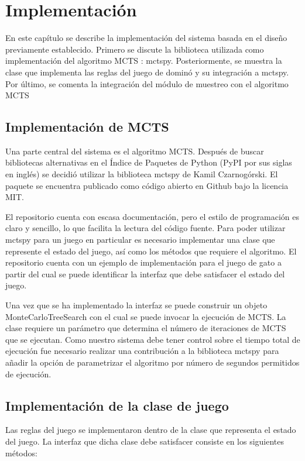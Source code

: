 \chapter{Implementación}

\noindent

En este capítulo se describe la implementación del sistema basada en el diseño
previamente establecido. Primero se discute la biblioteca utilizada como
implementación del algoritmo MCTS : mctspy. Posteriormente, se muestra la clase
que implementa las reglas del juego de dominó y su integración a mctspy. Por
último, se comenta la integración del módulo de muestreo con el algoritmo MCTS

\section{Implementación de MCTS}

Una parte central del sistema es el algoritmo MCTS. Después de buscar bibliotecas
alternativas en el Índice de Paquetes de Python (PyPI por sus siglas en inglés)
se decidió utilizar la biblioteca mctspy de Kamil Czarnogórski. El paquete se
encuentra publicado como código abierto en Github bajo la licencia MIT.

El repositorio cuenta con escasa documentación, pero el estilo de programación
es claro y sencillo, lo que facilita la lectura del código fuente. Para poder
utilizar mctspy para un juego en particular es necesario implementar una clase
que represente el estado del juego, así como los métodos que requiere el
algoritmo. El repositorio cuenta con un ejemplo de implementación para el juego
de gato a partir del cual se puede identificar la interfaz que debe satisfacer
el estado del juego.

Una vez que se ha implementado la interfaz se puede construir un objeto
MonteCarloTreeSearch con el cual se puede invocar la ejecución de MCTS. La clase
requiere un parámetro que determina el número de iteraciones de MCTS que se
ejecutan. Como nuestro sistema debe tener control sobre el tiempo total de
ejecución fue necesario realizar una contribución a la biblioteca mctspy para
añadir la opción de parametrizar el algoritmo por número de segundos permitidos
de ejecución.

\section{Implementación de la clase de juego}

Las reglas del juego se implementaron dentro de la clase que representa el
estado del juego. La interfaz que dicha clase debe satisfacer consiste en los
siguientes métodos:

